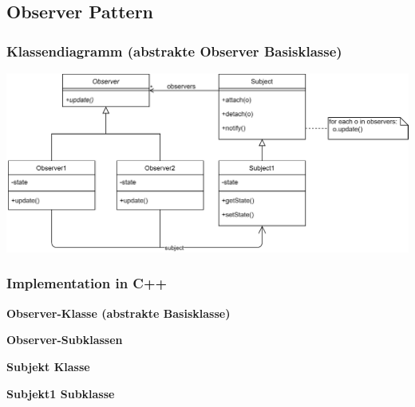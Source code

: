 


\subsection{Observer Pattern}

\subsubsection{Klassendiagramm (abstrakte Observer Basisklasse)}

\begin{center}
    \includegraphics[width=0.8\columnwidth]{images/ebs_observer_pattern_klassendiagramm.png}
\end{center}


\subsubsection{Implementation in C++}


\begin{outline}
    \1 \textbf{Observer-Klasse (abstrakte Basisklasse)}

    \1 \textbf{Observer-Subklassen}

    \1 \textbf{Subjekt Klasse}

    \1 \textbf{Subjekt1 Subklasse}
\end{outline}



